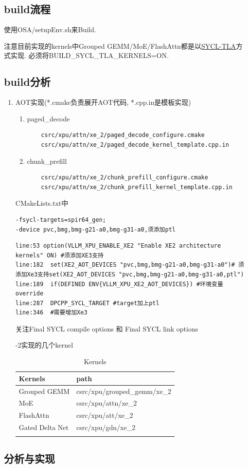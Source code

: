 \subsection{build流程}
使用OSA/setupEnv.sh来Build. 

注意目前实现的kernels中Grouped GEMM/MoE/FlashAttn都是以\href{https://github.com/intel/sycl-tla}{SYCL-TLA}方式实现. 必须将BUILD\_SYCL\_TLA\_KERNELS=ON.
\subsection{build分析}
\begin{enumerate}
    \item AOT实现(*.cmake负责展开AOT代码, *.cpp.in是模板实现)
    \begin{enumerate}
	\item paged\_decode
    \begin{lstlisting}
    csrc/xpu/attn/xe_2/paged_decode_configure.cmake
    csrc/xpu/attn/xe_2/paged_decode_kernel_template.cpp.in
    \end{lstlisting}
	\item chunk\_prefill
    \begin{lstlisting}
    csrc/xpu/attn/xe_2/chunk_prefill_configure.cmake
    csrc/xpu/attn/xe_2/chunk_prefill_kernel_template.cpp.in
    \end{lstlisting}
\end{enumerate}
CMakeLists.txt中
\begin{lstlisting}
-fsycl-targets=spir64_gen;
-device pvc,bmg,bmg-g21-a0,bmg-g31-a0,须添加ptl
\end{lstlisting}
\begin{lstlisting}
line:53 option(VLLM_XPU_ENABLE_XE2 "Enable XE2 architecture kernels" ON) #须添加XE3支持
line:182  set(XE2_AOT_DEVICES "pvc,bmg,bmg-g21-a0,bmg-g31-a0")# 须添加Xe3支持set(XE2_AOT_DEVICES "pvc,bmg,bmg-g21-a0,bmg-g31-a0,ptl")
line:189  if(DEFINED ENV{VLLM_XPU_XE2_AOT_DEVICES}) #环境变量override
line:287  DPCPP_SYCL_TARGET #target加上ptl
line:346  #需要增加Xe3
\end{lstlisting}
关注Final SYCL compile options 和  Final SYCL link options

\Xe-2实现的几个kernel
\begin{longtable}{p{6cm}p{12cm}}
\hline
Kernels & path\\
\hline
    Grouped GEMM & csrc/xpu/grouped\_gemm/xe\_2\\
    MoE & csrc/xpu/attn/xe\_2\\
    FlashAttn&csrc/xpu/att/xe\_2\\
    Gated Delta Net & csrc/xpu/gdn/xe\_2\\
\hline
    \caption{Kernels}{\label{impl_kerns}}
\end{longtable}
\end{enumerate}

\subsection{分析与实现}
    
